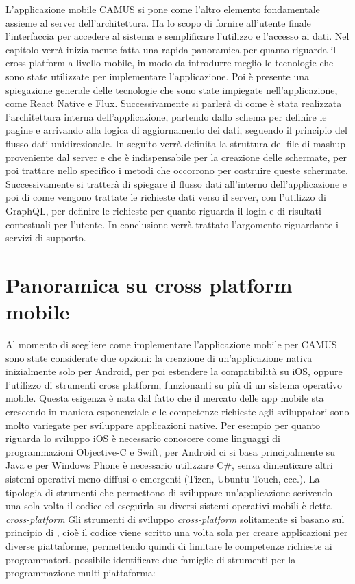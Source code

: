 L'applicazione mobile CAMUS si pone come l'altro elemento fondamentale assieme al server dell'architettura. Ha lo scopo di fornire all'utente finale l'interfaccia per accedere al sistema e semplificare l'utilizzo e l'accesso ai dati. Nel capitolo verrà inizialmente fatta una rapida panoramica per quanto riguarda il cross-platform a livello mobile, in modo da introdurre meglio le tecnologie che sono state utilizzate per implementare l'applicazione. Poi è presente una spiegazione generale delle tecnologie che sono state impiegate nell'applicazione, come React Native e Flux. Successivamente si parlerà di come è stata realizzata l'architettura interna dell'applicazione, partendo dallo schema per definire le pagine e arrivando alla logica di aggiornamento dei dati, seguendo il principio del flusso dati unidirezionale. In seguito verrà definita la struttura del file di mashup proveniente dal server e che è indispensabile per la creazione delle schermate, per poi trattare nello specifico i metodi che occorrono per costruire queste schermate.
Successivamente si tratterà di spiegare il flusso dati all'interno dell'applicazione e poi di come vengono trattate le richieste dati verso il server, con l'utilizzo di GraphQL, per definire le richieste per quanto riguarda il login e di risultati contestuali per l'utente. In conclusione verrà trattato l'argomento riguardante i servizi di supporto.

\section{Panoramica su cross platform mobile}\label{sec:panoramica-cross-platform-mobile}
Al momento di scegliere come implementare l'applicazione mobile per CAMUS sono state considerate due opzioni: la creazione di un'applicazione nativa inizialmente solo per Android, per poi estendere la compatibilità su iOS, oppure l'utilizzo di strumenti cross platform, funzionanti su più di un sistema operativo mobile.
Questa esigenza è nata dal fatto che il mercato delle app mobile sta crescendo in maniera esponenziale e le competenze richieste agli sviluppatori sono molto variegate per sviluppare applicazioni native.
Per esempio per quanto riguarda lo sviluppo iOS è necessario conoscere come linguaggi di programmazioni Objective-C e Swift, per Android ci si basa principalmente su Java e per Windows Phone è necessario utilizzare C\#, senza dimenticare altri sistemi operativi meno diffusi o emergenti (Tizen, Ubuntu Touch, ecc.). La tipologia di strumenti che permettono di sviluppare un'applicazione scrivendo una sola volta il codice ed eseguirla su diversi sistemi operativi mobili è detta \emph{cross-platform}
Gli strumenti di sviluppo \emph{cross-platform} solitamente si basano sul principio di , cioè il codice viene scritto una volta sola per creare applicazioni per diverse piattaforme, permettendo quindi di limitare le competenze richieste ai programmatori. 
\upe possibile identificare due famiglie di strumenti per la programmazione multi piattaforma:

